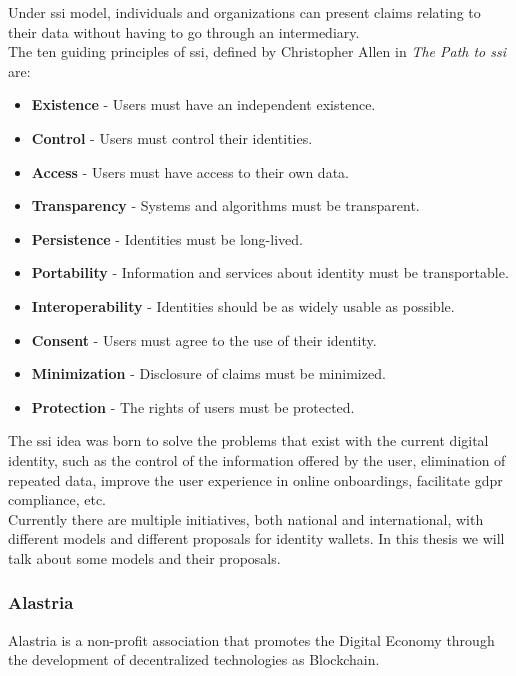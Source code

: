 \documentclass[a4paper, 12pt]{article} %
\begin{document}
            Under \acrlong{ssi} model, individuals and organizations can present claims relating to their data without having to go through an intermediary.\\
            
            The ten guiding principles of \acrshort{ssi}, defined by Christopher Allen in \textit{The Path to \acrlong{ssi}}\cite{path-to-ssi} are:\\
            \begin{itemize}
                \item \textbf{Existence} - Users must have an independent existence.
                \item \textbf{Control} - Users must control their identities.
                \item \textbf{Access} - Users must have access to their own data.
                \item \textbf{Transparency} - Systems and algorithms must be transparent.
                \item \textbf{Persistence} - Identities must be long-lived.
                \item \textbf{Portability} - Information and services about identity must be transportable.
                \item \textbf{Interoperability} - Identities should be as widely usable as possible.
                \item \textbf{Consent} - Users must agree to the use of their identity.
                \item \textbf{Minimization} - Disclosure of claims must be minimized.
                \item \textbf{Protection} - The rights of users must be protected.
            \end{itemize}
            
            The \acrshort{ssi} idea was born to solve the problems that exist with the current digital identity, such as the control of the information offered by the user, elimination of repeated data, improve the user experience in online onboardings, facilitate \acrshort{gdpr} compliance, etc.\\
            
            Currently there are multiple initiatives, both national and international, with different models and different proposals for identity wallets. In this thesis we will talk about some models and their proposals.
            
        \subsubsection{Alastria}
            Alastria is a non-profit association that promotes the Digital Economy through the development of decentralized technologies as Blockchain.\\
            
\end{document}
